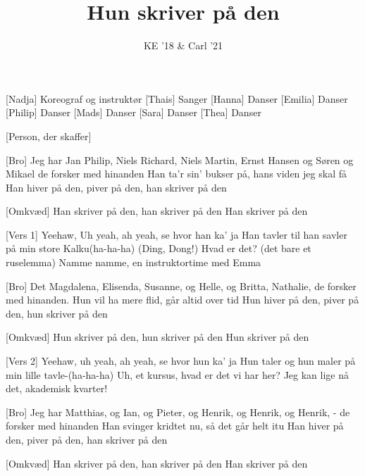 \documentclass[a4paper,11pt]{article}
\author{KE '18 \& Carl '21}
\title{Hun skriver på den}
\begin{document}
\maketitle
\begin{roles}
[Nadja] Koreograf og instruktør
[Thais] Sanger
[Hanna] Danser
[Emilia] Danser
[Philip] Danser
[Mads] Danser
[Sara] Danser
[Thea] Danser
\end{roles}
\begin{props}
[Person, der skaffer]
\end{props}
\begin{song}
[Bro] Jeg har Jan Philip, Niels Richard, Niels Martin, Ernst Hansen
og Søren og Mikael de forsker med hinanden
Han ta'r sin' bukser på, hans viden jeg skal få
Han hiver på den, piver på den, han skriver på den

[Omkvæd] Han skriver på den, han skriver på den 
Han skriver på den

[Vers 1] Yeehaw, Uh yeah, ah yeah, se hvor han ka' ja
Han tavler til han savler på min store Kalku(ha-ha-ha)
(Ding, Dong!) Hvad er det? (det bare et ruselemma)
Namme namme, en instruktortime med Emma

[Bro] Det Magdalena, Elisenda, Susanne, og Helle, og Britta, 
Nathalie, de forsker med hinanden.
Hun vil ha mere flid, går altid over tid
Hun hiver på den, piver på den, hun skriver på den

[Omkvæd] Hun skriver på den, hun skriver på den
Hun skriver på den

[Vers 2] Yeehaw, uh yeah, ah yeah, se hvor hun ka' ja
Hun taler og hun maler på min lille tavle-(ha-ha-ha)
Uh, et kursus, hvad er det vi har her?
Jeg kan lige nå det, akademisk kvarter!

[Bro] Jeg har Matthias, og Ian, og Pieter, og Henrik, og Henrik, 
og Henrik, - de forsker med hinanden
Han svinger kridtet nu, så det går helt itu
Han hiver på den, piver på den, han skriver på den

[Omkvæd] Han skriver på den, han skriver på den
Han skriver på den

\end{song}
\end{document}
